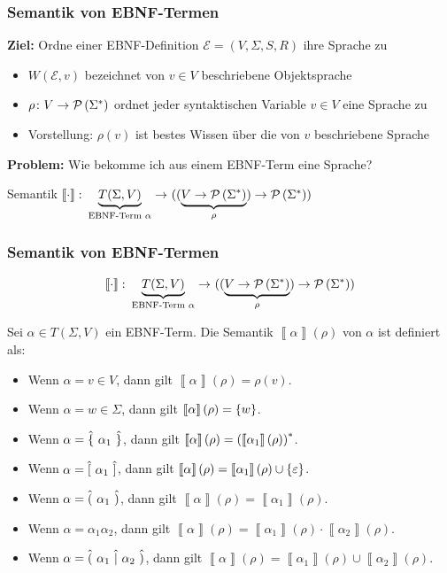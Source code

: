 \documentclass{beamer}
\newcommand{\sem}[1]{\left\llbracket #1 \right\rrbracket}
\begin{document}
\begin{frame} \frametitle{Semantik von EBNF-Termen}
	\small
	\textbf{Ziel:} Ordne einer EBNF-Definition $\mathcal{E} = (V,\Sigma,S,R)$ ihre Sprache zu
	\begin{itemize}
		\item $W(\mathcal{E}, v)$ bezeichnet von $v \in V$ beschriebene Objektsprache
		\item $\rho \colon V \to \mathcal{P}\left( \Sigma^\ast \right)$ ordnet jeder syntaktischen Variable $v \in V$ eine Sprache zu 
		\item Vorstellung: $\rho(v)$ ist bestes Wissen über die von $v$ beschriebene Sprache
	\end{itemize}
	\pause
	
	\textbf{Problem:} Wie bekomme ich aus einem EBNF-Term eine Sprache? 
		
	Semantik $\abb{\sem{\cdot}}{\underbrace{T(\Sigma, V)}_{\text{EBNF-Term } \alpha}}{((\underbrace{V \to \pows{\Sigma^\ast}}_{\rho}) \to \pows{\Sigma^\ast})}$
\end{frame}

\begin{frame} \frametitle{Semantik von EBNF-Termen}
	\begin{equation*}
		\abb{\sem{\cdot}}{\underbrace{T(\Sigma, V)}_{\text{EBNF-Term } \alpha}}{((\underbrace{V \to \pows{\Sigma^\ast}}_{\rho}) \to \pows{\Sigma^\ast})}
	\end{equation*}
	
	Sei $\alpha \in T(\Sigma, V)$ ein EBNF-Term. Die Semantik  $\sem{\alpha}(\rho)$ von $\alpha$ ist definiert als:
	\begin{itemize}
		\item Wenn $\alpha = v \in V$, dann gilt $\sem{\alpha}(\rho) = \rho(v)$.
		\item Wenn $\alpha = w \in \Sigma$, dann gilt $\sem{\alpha}(\rho) = \menge{w}$.
		\medskip
		\item Wenn $\alpha = \hat{\{} \ \alpha_1 \ \hat{\}}$, dann gilt $\sem{\alpha}(\rho) = \brackets{\sem{\alpha_1}(\rho)}^\ast$.
		\item Wenn $\alpha = \hat{[} \ \alpha_1 \ \hat{]}$, dann gilt $\sem{\alpha}(\rho) = \sem{\alpha_1}(\rho) \cup \menge{\epsilon}$.
		\item Wenn $\alpha = \hat{(} \ \alpha_1 \ \hat{)}$, dann gilt $\sem{\alpha}(\rho) = \sem{\alpha_1}(\rho)$.
		\medskip
		\item Wenn $\alpha = \alpha_1 \alpha_2$, dann gilt $\sem{\alpha}(\rho) = \sem{\alpha_1}(\rho) \cdot \sem{\alpha_2}(\rho)$.
		\item Wenn $\alpha = \hat{(} \ \alpha_1 \ \hat{|} \ \alpha_2 \ \hat{)}$, dann gilt $\sem{\alpha}(\rho) = \sem{\alpha_1}(\rho) \cup \sem{\alpha_2}(\rho)$.
	\end{itemize}
\end{frame}
\end{document}
